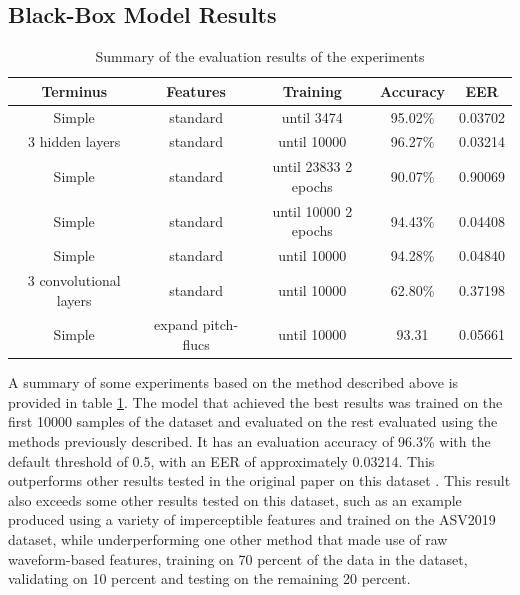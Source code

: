 \documentclass{article}
\begin{document}
		\subsection{Black-Box Model Results}
		\begin{table}[htbp]
			\centering\scriptsize
			\begin{tabular}{c | c | c | c | c}
				Terminus & Features & Training & Accuracy & EER \\
				\hline
				Simple & standard & until 3474 & 95.02\% & 0.03702 \\
				3 hidden layers & standard & until 10000 & 96.27\% & 0.03214 \\
				Simple & standard & until 23833 2 epochs & 90.07\% & 0.90069 \\
				Simple & standard & until 10000 2 epochs & 94.43\% & 0.04408 \\
				Simple & standard & until 10000 & 94.28\% & 0.04840 \\
				3 convolutional layers & standard & until 10000 & 62.80\% & 0.37198 \\
				Simple & expand pitch-flucs & until 10000 & 93.31 & 0.05661
			\end{tabular}
			\label{table:eval-results}
			\caption{Summary of the evaluation results of the experiments}
		\end{table}
		\sloppy
		A summary of some experiments based on the method described above is provided in table
		\ref{table:eval-results}. The model that achieved the best results was trained on the
		first 10000 samples of the dataset and evaluated on the rest evaluated using the methods
		previously described. It has an evaluation accuracy of 96.3\% with the default threshold of
		0.5, with an EER of approximately 0.03214. This outperforms other results tested in the
		original paper on this dataset \cite{muller_does_2022}. This result also exceeds some
		other results tested on this dataset, such as an example \cite{yang_robust_2024} produced
		using a variety of imperceptible features and trained on the ASV2019 dataset, while
		underperforming one other method \cite{ranjan_statnet_2022} that made use of raw
		waveform-based features, training on 70 percent of the data in the dataset, validating on
		10 percent and testing on the remaining 20 percent.
\end{document}
